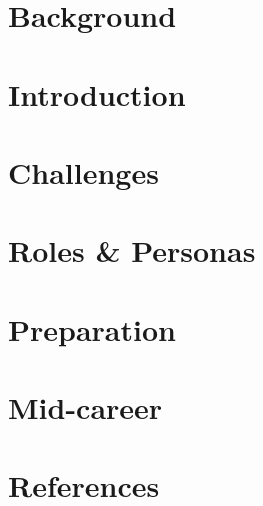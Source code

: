 \section[Back]{Background}


\section[Intro]{Introduction}


\section[Challenges]{Challenges}


\section[Roles]{Roles \& Personas}



\section[Prep]{Preparation}


\section[Mid]{Mid-career}


\section[Refs]{References}
